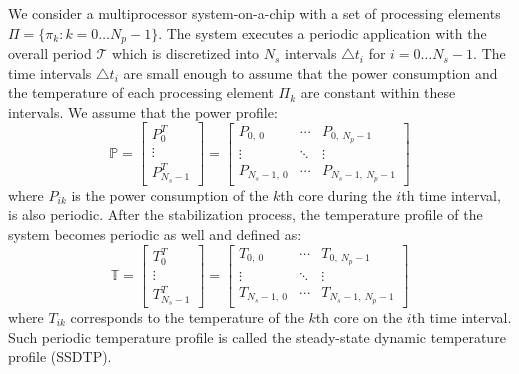 We consider a multiprocessor system-on-a-chip with a set of processing elements $\Pi = \{ \pi_k: k = 0 \dots N_p - 1 \}$. The system executes a periodic application with the overall period $\mathcal{T}$ which is discretized into $N_s$ intervals $\triangle t_i$ for $i = 0 \dots N_s - 1$. The time intervals $\triangle t_i$ are small enough to assume that the power consumption and the temperature of each processing element $\Pi_k$ are constant within these intervals. We assume that the power profile:
\begin{equation*}
  \mathbb{P} = \left[
    \begin{array}{c}
      P_0^T \\
      \vdots \\
      P_{N_s - 1}^T
    \end{array}
  \right] = \left[
    \begin{array}{ccc}
      P_{0, \: 0} & \cdots & P_{0, \: N_p - 1} \\
      \vdots & \ddots & \vdots \\
      P_{N_s - 1, \: 0} & \cdots & P_{N_s - 1, \: N_p - 1}
    \end{array}
  \right]
\end{equation*}
where $P_{ik}$ is the power consumption of the $k$th core during the $i$th time interval, is also periodic. After the stabilization process, the temperature profile of the system becomes periodic as well and defined as:
\begin{equation*}
  \mathbb{T} = \left[
    \begin{array}{c}
      T_0^T \\
      \vdots \\
      T_{N_s - 1}^T
    \end{array}
  \right] = \left[
    \begin{array}{ccc}
      T_{0, \: 0} & \cdots & T_{0, \: N_p - 1} \\
      \vdots & \ddots & \vdots \\
      T_{N_s - 1, \: 0} & \cdots & T_{N_s - 1, \: N_p - 1}
    \end{array}
  \right]
\end{equation*}
where $T_{ik}$ corresponds to the temperature of the $k$th core on the $i$th time interval. Such periodic temperature profile is called the steady-state dynamic temperature profile (SSDTP).

